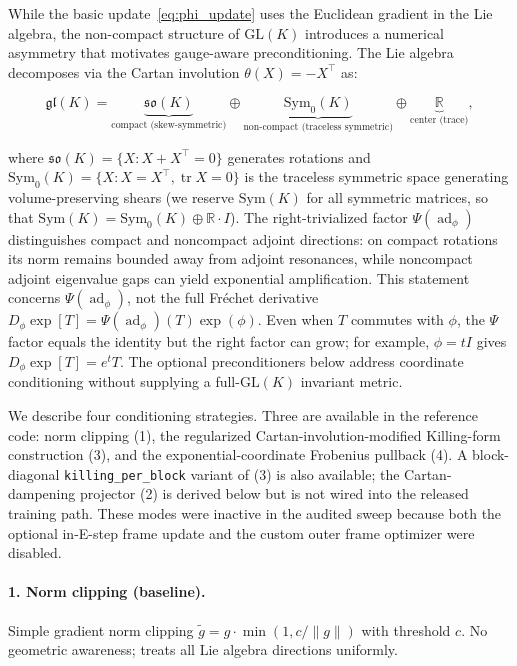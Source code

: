 \documentclass[twoside,11pt]{article}
\begin{document}
While the basic update~\eqref{eq:phi_update} uses the Euclidean gradient in the Lie algebra, the non-compact structure of $\mathrm{GL}(K)$ introduces a numerical asymmetry that motivates gauge-aware preconditioning. The Lie algebra decomposes via the Cartan involution $\theta(X) = -X^\top$ as:

\begin{equation}
\mathfrak{gl}(K) = \underbrace{\mathfrak{so}(K)}_{\text{compact (skew-symmetric)}} \oplus \underbrace{\mathrm{Sym}_0(K)}_{\text{non-compact (traceless symmetric)}} \oplus \underbrace{\mathbb{R}}_{\text{center (trace)}},
\label{eq:cartan_decomposition}
\end{equation}

where $\mathfrak{so}(K) = \{X : X + X^\top = 0\}$ generates rotations and $\mathrm{Sym}_0(K) = \{X : X = X^\top, \operatorname{tr} X = 0\}$ is the traceless symmetric space generating volume-preserving shears (we reserve $\mathrm{Sym}(K)$ for all symmetric matrices, so that $\mathrm{Sym}(K) = \mathrm{Sym}_0(K) \oplus \mathbb{R}\cdot I$). The right-trivialized factor $\Psi(\operatorname{ad}_\phi)$ distinguishes compact and noncompact adjoint directions: on compact rotations its norm remains bounded away from adjoint resonances, while noncompact adjoint eigenvalue gaps can yield exponential amplification. This statement concerns $\Psi(\operatorname{ad}_\phi)$, not the full Fr\'echet derivative $D_\phi\exp[T]=\Psi(\operatorname{ad}_\phi)(T)\exp(\phi)$. Even when $T$ commutes with $\phi$, the $\Psi$ factor equals the identity but the right factor can grow; for example, $\phi=tI$ gives $D_\phi\exp[T]=e^tT$. The optional preconditioners below address coordinate conditioning without supplying a full-$\mathrm{GL}(K)$ invariant metric.

We describe four conditioning strategies. Three are available in the reference code: norm clipping (1), the regularized Cartan-involution-modified Killing-form construction (3), and the exponential-coordinate Frobenius pullback (4). A block-diagonal \texttt{killing\_per\_block} variant of (3) is also available; the Cartan-dampening projector (2) is derived below but is not wired into the released training path. These modes were inactive in the audited sweep because both the optional in-E-step frame update and the custom outer frame optimizer were disabled.

\paragraph{1. Norm clipping (baseline).}
Simple gradient norm clipping $\tilde{g} = g \cdot \min(1, c/\|g\|)$ with threshold $c$. No geometric awareness; treats all Lie algebra directions uniformly.
\end{document}
